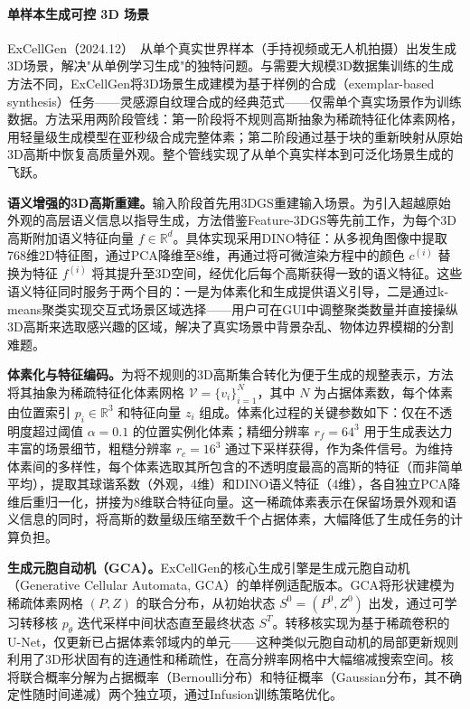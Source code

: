 \paragraph{单样本生成可控 3D 场景}

ExCellGen（2024.12）~\cite{2412_16253}从单个真实世界样本（手持视频或无人机拍摄）出发生成3D场景，解决"从单例学习生成"的独特问题。与需要大规模3D数据集训练的生成方法不同，ExCellGen将3D场景生成建模为基于样例的合成（exemplar-based synthesis）任务——灵感源自纹理合成的经典范式——仅需单个真实场景作为训练数据。方法采用两阶段管线：第一阶段将不规则高斯抽象为稀疏特征化体素网格，用轻量级生成模型在亚秒级合成完整体素；第二阶段通过基于块的重新映射从原始3D高斯中恢复高质量外观。整个管线实现了从单个真实样本到可泛化场景生成的飞跃。

\textbf{语义增强的3D高斯重建。}输入阶段首先用3DGS重建输入场景。为引入超越原始外观的高层语义信息以指导生成，方法借鉴Feature-3DGS等先前工作，为每个3D高斯附加语义特征向量 $f \in \mathbb{R}^d$。具体实现采用DINO特征：从多视角图像中提取768维2D特征图，通过PCA降维至8维，再通过将可微渲染方程中的颜色 $c^{(i)}$ 替换为特征 $f^{(i)}$ 将其提升至3D空间，经优化后每个高斯获得一致的语义特征。这些语义特征同时服务于两个目的：一是为体素化和生成提供语义引导，二是通过k-means聚类实现交互式场景区域选择——用户可在GUI中调整聚类数量并直接操纵3D高斯来选取感兴趣的区域，解决了真实场景中背景杂乱、物体边界模糊的分割难题。

\textbf{体素化与特征编码。}为将不规则的3D高斯集合转化为便于生成的规整表示，方法将其抽象为稀疏特征化体素网格 $\mathcal{V} = \{v_i\}_{i=1}^N$，其中 $N$ 为占据体素数，每个体素由位置索引 $p_i \in \mathbb{R}^3$ 和特征向量 $z_i$ 组成。体素化过程的关键参数如下：仅在不透明度超过阈值 $\alpha=0.1$ 的位置实例化体素；精细分辨率 $r_f = 64^3$ 用于生成表达力丰富的场景细节，粗糙分辨率 $r_c = 16^3$ 通过下采样获得，作为条件信号。为维持体素间的多样性，每个体素选取其所包含的不透明度最高的高斯的特征（而非简单平均），提取其球谐系数（外观，4维）和DINO语义特征（4维），各自独立PCA降维后重归一化，拼接为8维联合特征向量。这一稀疏体素表示在保留场景外观和语义信息的同时，将高斯的数量级压缩至数千个占据体素，大幅降低了生成任务的计算负担。

\textbf{生成元胞自动机（GCA）。}ExCellGen的核心生成引擎是生成元胞自动机（Generative Cellular Automata, GCA）的单样例适配版本。GCA将形状建模为稀疏体素网格 $(P, Z)$ 的联合分布，从初始状态 $S^0 = (P^0, Z^0)$ 出发，通过可学习转移核 $p_\theta$ 迭代采样中间状态直至最终状态 $S^T$。转移核实现为基于稀疏卷积的U-Net，仅更新已占据体素邻域内的单元——这种类似元胞自动机的局部更新规则利用了3D形状固有的连通性和稀疏性，在高分辨率网格中大幅缩减搜索空间。核将联合概率分解为占据概率（Bernoulli分布）和特征概率（Gaussian分布，其不确定性随时间递减）两个独立项，通过Infusion训练策略优化。

